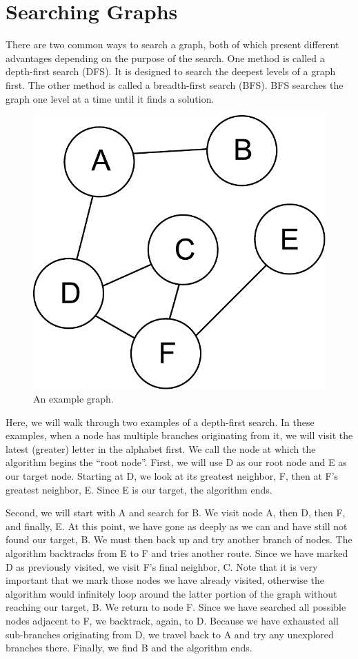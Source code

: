 \section*{Searching Graphs}
There are two common ways to search a graph, both of which present different advantages depending on the purpose of the search.
One method is called a depth-first search (DFS).  It is designed to search the deepest levels of a graph first.
The other method is called a breadth-first search (BFS).  BFS searches the graph one level at a time until it finds a solution.
\begin{figure}[h]
\centering
\includegraphics[width=.5\textwidth]{graph.pdf}
\caption{An example graph.}
\label{fig:bfs_dfs_graph}
\end{figure}


Here, we will walk through two examples of a depth-first search.
In these examples, when a node has multiple branches originating from it,
we will visit the latest (greater) letter in the alphabet first.
We call the node at which the algorithm begins the ``root node''.
First, we will use D as our root node and E as our target node.
Starting at D, we look at its greatest neighbor, F, then at F's greatest
neighbor, E. Since E is our target, the algorithm ends.

Second, we will start with A and search for B.
We visit node A, then D, then F, and finally, E.
At this point, we have gone as deeply as we can and have still not found our target, B.
We must then back up and try another branch of nodes.
The algorithm backtracks from E to F and tries another route.
Since we have marked D as previously visited, we visit F's final neighbor, C.
Note that it is very important that we mark those nodes we have already visited,
otherwise the algorithm would infinitely loop around the latter portion of
the graph without reaching our target, B. We return to node F. Since we have
searched all possible nodes adjacent to F, we backtrack, again, to D. Because we have
exhausted all sub-branches originating from D, we travel back to A and try
any unexplored branches there. Finally, we find B and the algorithm ends.

